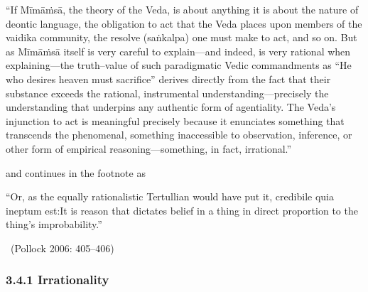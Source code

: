 \begin{myquote}
“If Mīmāṁsā, the theory of the Veda, is about anything it is about the nature of deontic language, the obligation to act that the Veda places upon members of the vaidika community, the resolve (saṅkalpa) one must make to act, and so on. But as Mīmāṁsā itself is very careful to explain—and indeed, is very rational when explaining—the truth–value of such paradigmatic Vedic commandments as “He who desires heaven must sacrifice” derives directly from the fact that their substance exceeds the rational, instrumental understanding—precisely the understanding that underpins any authentic form of agentiality. The Veda’s injunction to act is meaningful precisely because it enunciates something that transcends the phenomenal, something inaccessible to observation, inference, or other form of empirical reasoning—something, in fact, irrational.”
\end{myquote}

and continues in the footnote as

\begin{myquote}
“Or, as the equally rationalistic Tertullian would have put it, credibile quia ineptum est:It is reason that dictates belief in a thing in direct proportion to the thing’s improbability.” 

~\hfill (Pollock 2006: 405–406)
\end{myquote}


\subsubsection*{3.4.1 Irrationality}

